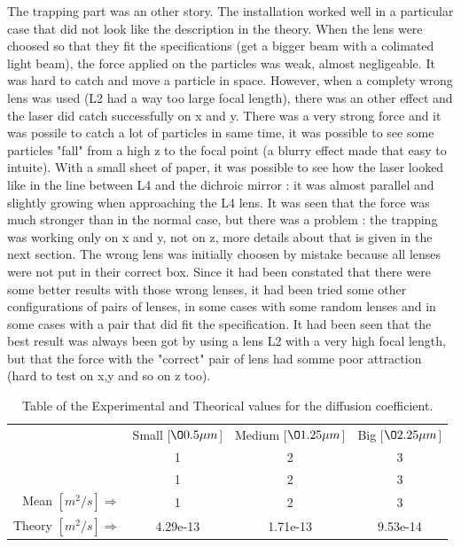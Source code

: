 \documentclass[a4paper,12pt,twoside]{article}	%
\begin{document}
The trapping part was an other story. The installation worked well in a particular case that did not look like the description in the theory. When the lens were choosed so that they fit the specifications (get a bigger beam with a colimated light beam), the force applied on the particles was weak, almost negligeable. It was hard to catch and move a particle in space. However, when a complety wrong lens was used (L2 had a way too large focal length), there was an other effect and the laser did catch successfully on x and y. There was a very strong force and it was possile to catch a lot of particles in same time, it was possible to see some particles "fall" from a high z to the focal point (a blurry effect made that easy to intuite). With a small sheet of paper, it was possible to see how the laser looked like in the line between L4 and the dichroic mirror : it was almost parallel and slightly growing when approaching the L4 lens. It was seen that the force was much stronger than in the normal case, but there was a problem : the trapping was working only on x and y, not on z, more details about that is given in the next section. The wrong lens was initially choosen by mistake because all lenses were not put in their correct box. Since it had been constated that there were some better results with those wrong lenses, it had been tried some other configurations of pairs of lenses, in some cases with some random lenses and in some cases with a pair that did fit the specification. It had been seen that the best result was always been got by using a lens L2 with a very high focal length, but that the force with the "correct" pair of lens had somme poor attraction (hard to test on x,y and so on z too). 









\begin{table}
	\begin{tabular}{ r|c|c|c| }
		\multicolumn{1}{r}{} &  \multicolumn{1}{c}{Small [$\O 0.5\mu m$]} & 			\multicolumn{1}{c}{Medium [$\O 1.25\mu m$]} & 			\multicolumn{1}{c}{Big [$\O 2.25\mu m$]}\\
		\cline{2-4}						& 1 & 2 & 3 \\
		  								& 1 & 2 & 3 \\

		\cline{2-4} Mean $[m^2/s] \Rightarrow$ & 1 & 2 & 3\\
		\cline{2-4} Theory $[m^2/s] \Rightarrow$ & 4.29e-13 & 1.71e-13 & 9.53e-14\\
		\cline{2-4}
	\end{tabular}
	\caption{Table of the Experimental and Theorical values for the diffusion coefficient.}
	\label{tab:diffusion}
\end{table}
\end{document}
